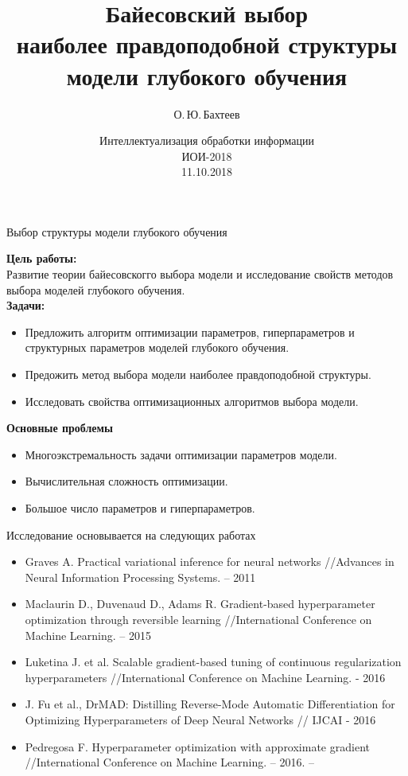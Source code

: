 \documentclass[usenames,dvipsnames,11pt,pdf,utf8,russian,aspectratio=169]{beamer}
\title[Выбор структуры модели]{Байесовский выбор\\ наиболее правдоподобной структуры\\ модели глубокого обучения}
\author{О.\,Ю.\,Бахтеев}
\institute[МФТИ]{Научный руководитель: д.ф.-м.н. В.В. Стрижов\\Московский физико-технический институт (государственный университет)}
\date[2018]{Интеллектуализация обработки информации\\ ИОИ-2018 \\11.10.2018\\}
\begin{document}
\begin{frame}
  \titlepage
\end{frame}



\begin{frame}{Выбор  структуры модели глубокого обучения}

\textbf{Цель работы:}\\
Развитие теории байесовскогго выбора модели и исследование свойств методов выбора моделей глубокого обучения.\\
\textbf{Задачи:}
\begin{itemize}
\item Предложить алгоритм оптимизации параметров, гиперпараметров и структурных параметров моделей глубокого обучения.
\item Предожить метод выбора модели наиболее правдоподобной структуры.
\item Исследовать свойства оптимизационных алгоритмов выбора модели.
\end{itemize}
\textbf{Основные проблемы}
\begin{itemize}
\item Многоэкстремальность задачи оптимизации параметров модели.
\item Вычислительная сложность оптимизации.
\item Большое число параметров и гиперпараметров.
\end{itemize}

\end{frame}

\begin{frame}{Исследование основывается на следующих работах}
\begin{itemize}
\item Graves A. Practical variational inference for neural networks //Advances in Neural Information Processing Systems. – 2011
\item  Maclaurin D., Duvenaud D., Adams R. Gradient-based hyperparameter optimization through reversible learning //International Conference on Machine Learning. – 2015
\item  Luketina J. et al. Scalable gradient-based tuning of continuous regularization hyperparameters //International Conference on Machine Learning. - 2016
\item J. Fu et al., DrMAD: Distilling Reverse-Mode Automatic Differentiation for Optimizing
Hyperparameters of Deep Neural Networks // IJCAI - 2016
\item Pedregosa F. Hyperparameter optimization with approximate gradient //International Conference on Machine Learning. – 2016. –
\end{itemize}
\end{frame}
\end{document}
